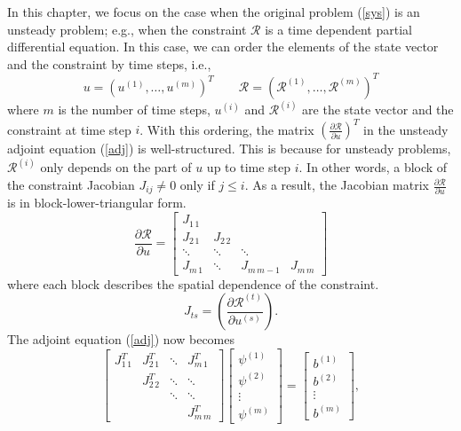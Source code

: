     In this chapter, we focus on the case when the original problem (\ref{sys})
    is an unsteady problem; e.g., when the constraint $\mathcal{R}$ is a time
    dependent partial differential equation.  In this case, we can order the
    elements of the state vector and the constraint by time steps,
    i.e.,
    \[ u = \left( u^{(1)}, \ldots, u^{(m)} \right)^T  \qquad
           \mathcal{R} = \left( \mathcal{R}^{(1)}, \ldots,
                                \mathcal{R}^{(m)} \right)^T
    \]
    where $m$ is the number of time steps, $u^{(i)}$ and $\mathcal{R}^{(i)}$ are
    the state vector and the constraint at time step $i$.  With this ordering,
    the matrix $\left( \frac{\partial\mathcal{R}}{\partial u} \right)^T$
    in the unsteady adjoint equation (\ref{adj}) is well-structured.  This is
    because for unsteady problems, $\mathcal{R}^{(i)}$ only depends on the part
    of $u$ up to time step $i$.  In other words, a block of the constraint
    Jacobian $J_{i j} \ne 0$ only if $j\le i$.  As a result, the Jacobian matrix
    $\frac{\partial \mathcal{R}}{\partial u}$
    is in block-lower-triangular form.
    \begin{equation} \label{lower}
        \frac{\partial \mathcal{R}}{\partial u} =
        \begin{bmatrix}
            J_{1\,1} &          &            & \\
            J_{2\,1} & J_{2\,2} &            & \\
            \ddots   & \ddots   & \ddots     & \\
            J_{m\,1} & \ddots   & J_{m\,m-1} & J_{m\,m}
        \end{bmatrix}
    \end{equation}
    where each block describes the spatial dependence of the constraint.
    \[ J_{t s} =
        \left( \frac{\partial \mathcal{R}^{(t)}}{\partial u^{(s)}} \right).
    \]
    The adjoint equation (\ref{adj}) now becomes
    \begin{equation} \label{uadj}
        \begin{bmatrix}
        J_{1\,1}^T & J_{2\,1}^T & \ddots     & J_{m\,1}^T   \\
                   & J_{2\,2}^T & \ddots     & \ddots       \\
                   &            & \ddots     & \ddots       \\
                   &            &            & J_{m\,m}^T
        \end{bmatrix}
        \begin{bmatrix}
            \psi^{(1)} \\ \psi^{(2)} \\ \vdots \\ \psi^{(m)}
        \end{bmatrix}
        = \begin{bmatrix} b^{(1)} \\ b^{(2)} \\ \vdots \\ b^{(m)} \end{bmatrix},
    \end{equation}
